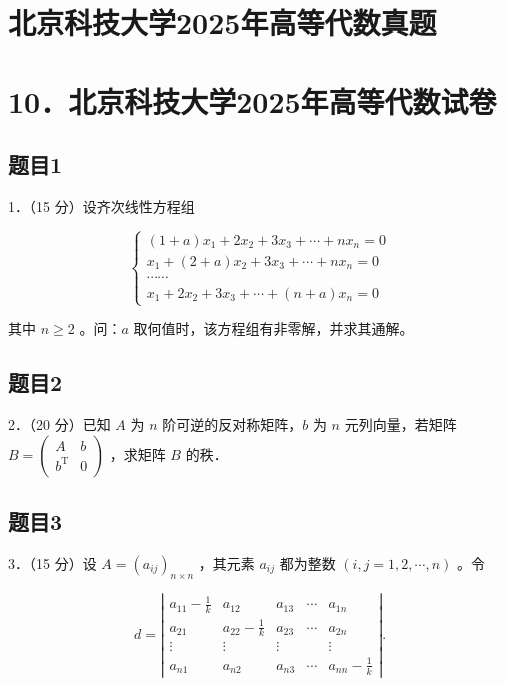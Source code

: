 \documentclass{article}
\begin{document}
\section*{北京科技大学2025年高等代数真题}
\section*{10．北京科技大学2025年高等代数试卷}

\subsection{题目1}
1．（15 分）设齐次线性方程组

\[
\left\{\begin{array}{c}
(1+a) x_{1}+2 x_{2}+3 x_{3}+\cdots+n x_{n}=0 \\
x_{1}+(2+a) x_{2}+3 x_{3}+\cdots+n x_{n}=0 \\
\cdots \cdots \\
x_{1}+2 x_{2}+3 x_{3}+\cdots+(n+a) x_{n}=0
\end{array}\right.
\]

其中 \(n \geq 2\) 。问：\(a\) 取何值时，该方程组有非零解，并求其通解。

\subsection{题目2}
2．（20 分）已知 \(A\) 为 \(n\) 阶可逆的反对称矩阵，\(b\) 为 \(n\) 元列向量，若矩阵 \(B=\left(\begin{array}{cc}A & b \\ b^{\mathrm{T}} & 0\end{array}\right)\) ，求矩阵 \(B\) 的秩．

\subsection{题目3}
3．（15 分）设 \(A=\left(a_{i j}\right)_{n \times n}\) ，其元素 \(a_{i j}\) 都为整数 \((i, j=1,2, \cdots, n)\) 。令

\[
d=\left|\begin{array}{ccccc}
a_{11}-\frac{1}{k} & a_{12} & a_{13} & \cdots & a_{1 n} \\
a_{21} & a_{22}-\frac{1}{k} & a_{23} & \cdots & a_{2 n} \\
\vdots & \vdots & \vdots & & \vdots \\
a_{n 1} & a_{n 2} & a_{n 3} & \cdots & a_{n n}-\frac{1}{k}
\end{array}\right| .
\]
\end{document}
